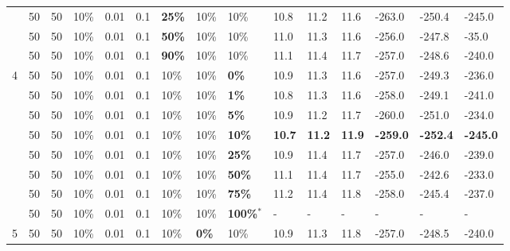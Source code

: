 \begin{table}
\begin{tabular}{|l|l|l|l|l|l|l|l|l||l|l|l|l|l|l|}
    ~ & 50 & 50 & 10\% & 0.01 & 0.1 & \textbf{25\%} & 10\% & 10\% & 10.8 & 11.2 & 11.6 & -263.0 & -250.4 & -245.0 \\
    ~ & 50 & 50 & 10\% & 0.01 & 0.1 & \textbf{50\%} & 10\% & 10\% & 11.0 & 11.3 & 11.6 & -256.0 & -247.8 & -35.0 \\
    ~ & 50 & 50 & 10\% & 0.01 & 0.1 & \textbf{90\%} & 10\% & 10\% & 11.1 & 11.4 & 11.7 & -257.0 & -248.6 & -240.0 \\
    \hline
    4 & 50 & 50 & 10\% & 0.01 & 0.1 & 10\% & 10\% & \textbf{0\%} & 10.9 & 11.3 & 11.6 & -257.0 & -249.3 & -236.0 \\
    ~ & 50 & 50 & 10\% & 0.01 & 0.1 & 10\% & 10\% & \textbf{1\%} & 10.8 & 11.3 & 11.6 & -258.0 & -249.1 & -241.0 \\
    ~ & 50 & 50 & 10\% & 0.01 & 0.1 & 10\% & 10\% & \textbf{5\%} &  10.9 & 11.2 & 11.7 & -260.0 & -251.0 & -234.0 \\
    ~ & 50 & 50 & 10\% & 0.01 & 0.1 & 10\% & 10\% & \textbf{10\%} & \textbf{10.7} & \textbf{11.2} & \textbf{11.9} & \textbf{-259.0} & \textbf{-252.4} & \textbf{-245.0} \\
    ~ & 50 & 50 & 10\% & 0.01 & 0.1 & 10\% & 10\% & \textbf{25\%} & 10.9 & 11.4 & 11.7 & -257.0 & -246.0 & -239.0 \\
    ~ & 50 & 50 & 10\% & 0.01 & 0.1 & 10\% & 10\% & \textbf{50\%} & 11.1 & 11.4 & 11.7 & -255.0 & -242.6 & -233.0 \\
    ~ & 50 & 50 & 10\% & 0.01 & 0.1 & 10\% & 10\% & \textbf{75\%} & 11.2 & 11.4 & 11.8 & -258.0 & -245.4 & -237.0 \\
    ~ & 50 & 50 & 10\% & 0.01 & 0.1 & 10\% & 10\% & \textbf{100\%$^*$} & - & - & - & - & - & - \\
    \hline
    5 & 50 & 50 & 10\% & 0.01 & 0.1 & 10\% & \textbf{0\%} & 10\% & 10.9 & 11.3 & 11.8 & -257.0 & -248.5 & -240.0 \\

\end{tabular}
\end{table}
